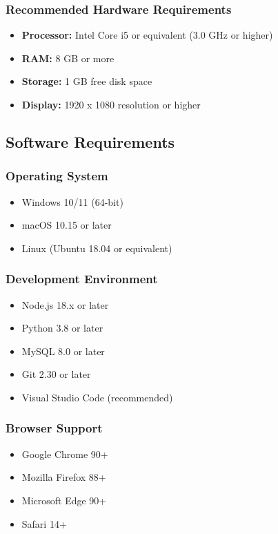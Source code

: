 \documentclass[12pt,a4paper]{article}
\begin{document}
\subsubsection{Recommended Hardware Requirements}
\begin{itemize}
    \item \textbf{Processor:} Intel Core i5 or equivalent (3.0 GHz or higher)
    \item \textbf{RAM:} 8 GB or more
    \item \textbf{Storage:} 1 GB free disk space
    \item \textbf{Display:} 1920 x 1080 resolution or higher
\end{itemize}

\subsection{Software Requirements}

\subsubsection{Operating System}
\begin{itemize}
    \item Windows 10/11 (64-bit)
    \item macOS 10.15 or later
    \item Linux (Ubuntu 18.04 or equivalent)
\end{itemize}

\subsubsection{Development Environment}
\begin{itemize}
    \item Node.js 18.x or later
    \item Python 3.8 or later
    \item MySQL 8.0 or later
    \item Git 2.30 or later
    \item Visual Studio Code (recommended)
\end{itemize}

\subsubsection{Browser Support}
\begin{itemize}
    \item Google Chrome 90+
    \item Mozilla Firefox 88+
    \item Microsoft Edge 90+
    \item Safari 14+
\end{itemize}
\end{document}
